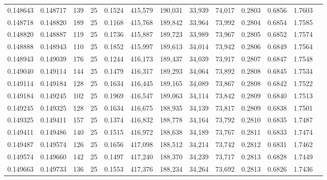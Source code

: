 \begin{tabular}{rrrrrrrrrrrrr}
0.148643 & 0.148717 &   139 &  25 &                                     0.1524 & 415,579 & 190,031 &  33,939 &  74,017 & 0.2803 & 0.6856 & 1.7603 \\
0.148718 & 0.148820 &   189 &  25 &                                     0.1168 & 415,768 & 189,842 &  33,964 &  73,992 & 0.2804 & 0.6854 & 1.7585 \\
0.148820 & 0.148887 &   119 &  25 &                                     0.1736 & 415,887 & 189,723 &  33,989 &  73,967 & 0.2805 & 0.6852 & 1.7574 \\
0.148888 & 0.148943 &   110 &  25 &                                     0.1852 & 415,997 & 189,613 &  34,014 &  73,942 & 0.2806 & 0.6849 & 1.7564 \\
0.148943 & 0.149039 &   176 &  25 &                                     0.1244 & 416,173 & 189,437 &  34,039 &  73,917 & 0.2807 & 0.6847 & 1.7548 \\
0.149040 & 0.149114 &   144 &  25 &                                     0.1479 & 416,317 & 189,293 &  34,064 &  73,892 & 0.2808 & 0.6845 & 1.7534 \\
0.149114 & 0.149184 &   128 &  25 &                                     0.1634 & 416,445 & 189,165 &  34,089 &  73,867 & 0.2808 & 0.6842 & 1.7522 \\
0.149184 & 0.149245 &   102 &  25 &                                     0.1969 & 416,547 & 189,063 &  34,114 &  73,842 & 0.2809 & 0.6840 & 1.7513 \\
0.149245 & 0.149325 &   128 &  25 &                                     0.1634 & 416,675 & 188,935 &  34,139 &  73,817 & 0.2809 & 0.6838 & 1.7501 \\
0.149325 & 0.149411 &   157 &  25 &                                     0.1374 & 416,832 & 188,778 &  34,164 &  73,792 & 0.2810 & 0.6835 & 1.7487 \\
0.149411 & 0.149486 &   140 &  25 &                                     0.1515 & 416,972 & 188,638 &  34,189 &  73,767 & 0.2811 & 0.6833 & 1.7474 \\
0.149487 & 0.149574 &   126 &  25 &                                     0.1656 & 417,098 & 188,512 &  34,214 &  73,742 & 0.2812 & 0.6831 & 1.7462 \\
0.149574 & 0.149660 &   142 &  25 &                                     0.1497 & 417,240 & 188,370 &  34,239 &  73,717 & 0.2813 & 0.6828 & 1.7449 \\
0.149663 & 0.149733 &   136 &  25 &                                     0.1553 & 417,376 & 188,234 &  34,264 &  73,692 & 0.2813 & 0.6826 & 1.7436 \\

\end{tabular}
